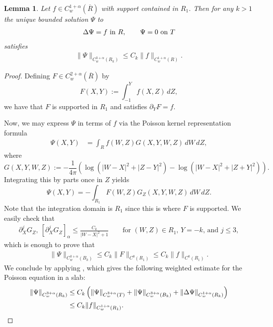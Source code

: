 \documentclass[11pt,reqno]{amsart}
\newcommand{\n}[2][]{#1\lVert #2 #1\rVert}
\newcommand{\abs}[2][]{#1\lvert #2 #1\rvert}
\theoremstyle{plain}
\newtheorem{lemma}[theorem]{Lemma}
\theoremstyle{remark}
\numberwithin{equation}{section}
\begin{document}
\begin{lemma}\label{simplegreens}
  Let $f \in C^{1+\alpha}_w(\overline R)$ with support contained in $R_1$. 
  Then for any $k > 1$ the unique bounded solution $\Psi$ to 
  \begin{align*}
    \Delta \Psi = f \textup{~in~} R,
    \qquad 
    \Psi = 0 \textup{~on~} T
  \end{align*}
  satisfies
  \begin{align*}
    \| \Psi \|_{C^{3+\alpha}_w(R_k)}
    \le C_k \| f \|_{C^{1+\alpha}_w(R)}.
  \end{align*}
\end{lemma}
\begin{proof}
  Defining $F \in C_w^{2+\alpha}(\overline{R})$ by
  \[ F(X,Y) := \int_{-1}^Y f(X,Z) \, dZ, \]
  we have that $F$ is supported in $R_1$ and satisfies $\partial_Y F = f$.  

  Now, we may express $\Psi$ in terms of $f$ via the Poisson kernel representation formula
  \begin{align*}
    \Psi(X,Y) &= \int_R f(W,Z) G(X,Y,W,Z) \, dW \, dZ,
  \end{align*}
  where 
  \[ G(X,Y,W,Z) :=  - \frac 1{4\pi} \left(\log{\left(|W-X|^2 + |Z-Y|^2\right)} - \log{\left(|W-X|^2+|Z+Y|^2\right)} \right).\]
  Integrating this by parts once in $Z$ yields 
  \[ \Psi(X,Y) = - \int_{R_1} F(W,Z) G_Z(X,Y,W,Z) \, dW \, dZ. \]
  Note that the integration domain is $R_1$ since this is where $F$ is supported.  We easily check that 
  \begin{align*}
    \partial_X^j G_Z,\ 
    [\partial_X^j G_Z]_\alpha
    \le \frac {C_k}{\abs{W-X}^2+1}
    \qquad 
    \text{for $(W,Z) \in R_1$, $Y=-k$, and $j \le 3$},
  \end{align*}
 which is enough to prove that 
  \begin{align*}
    \n\Psi_{C^{3+\alpha}_w(B_k)} \le C_k \n F_{C^0(R_1)}
    \le C_k \n f_{C^0(R_1)}.
  \end{align*}
  We conclude by applying \cite[Lemma~5.2]{craig1988symmetry}, which gives the following weighted estimate for the Poisson equation in a slab:
  \begin{align}
    \label{eqn:dirstrip}
    \n \Psi_{C^{3+\alpha}_w(R_k)}  &\le 
    C_k\left( \n\Psi_{C^{3+\alpha}_w(T)} 
    + \n\Psi_{C^{3+\alpha}_w(B_k)} 
    + \n{\Delta \Psi}_{C^{1+\alpha}_w(R_k)}
    \right)\\
    \notag
    &\le C_k \n f_{C^{1+\alpha}_w(R_1)}.
    \qedhere
  \end{align}
\end{proof}
\end{document}
